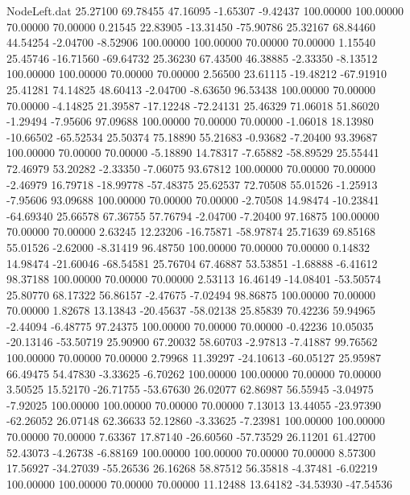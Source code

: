 \begin{filecontents}{NodeLeft.dat}
  25.27100   69.78455   47.16095    -1.65307   -9.42437  100.00000  100.00000   70.00000   70.00000    0.21545   22.83905  -13.31450  -75.90786
  25.32167   68.84460   44.54254    -2.04700   -8.52906  100.00000  100.00000   70.00000   70.00000    1.15540   25.45746  -16.71560  -69.64732
  25.36230   67.43500   46.38885    -2.33350   -8.13512  100.00000  100.00000   70.00000   70.00000    2.56500   23.61115  -19.48212  -67.91910
  25.41281   74.14825   48.60413    -2.04700   -8.63650   96.53438  100.00000   70.00000   70.00000   -4.14825   21.39587  -17.12248  -72.24131
  25.46329   71.06018   51.86020    -1.29494   -7.95606   97.09688  100.00000   70.00000   70.00000   -1.06018   18.13980  -10.66502  -65.52534
  25.50374   75.18890   55.21683    -0.93682   -7.20400   93.39687  100.00000   70.00000   70.00000   -5.18890   14.78317   -7.65882  -58.89529
  25.55441   72.46979   53.20282    -2.33350   -7.06075   93.67812  100.00000   70.00000   70.00000   -2.46979   16.79718  -18.99778  -57.48375
  25.62537   72.70508   55.01526    -1.25913   -7.95606   93.09688  100.00000   70.00000   70.00000   -2.70508   14.98474  -10.23841  -64.69340
  25.66578   67.36755   57.76794    -2.04700   -7.20400   97.16875  100.00000   70.00000   70.00000    2.63245   12.23206  -16.75871  -58.97874
  25.71639   69.85168   55.01526    -2.62000   -8.31419   96.48750  100.00000   70.00000   70.00000    0.14832   14.98474  -21.60046  -68.54581
  25.76704   67.46887   53.53851    -1.68888   -6.41612   98.37188  100.00000   70.00000   70.00000    2.53113   16.46149  -14.08401  -53.50574
  25.80770   68.17322   56.86157    -2.47675   -7.02494   98.86875  100.00000   70.00000   70.00000    1.82678   13.13843  -20.45637  -58.02138
  25.85839   70.42236   59.94965    -2.44094   -6.48775   97.24375  100.00000   70.00000   70.00000   -0.42236   10.05035  -20.13146  -53.50719
  25.90900   67.20032   58.60703    -2.97813   -7.41887   99.76562  100.00000   70.00000   70.00000    2.79968   11.39297  -24.10613  -60.05127
  25.95987   66.49475   54.47830    -3.33625   -6.70262  100.00000  100.00000   70.00000   70.00000    3.50525   15.52170  -26.71755  -53.67630
  26.02077   62.86987   56.55945    -3.04975   -7.92025  100.00000  100.00000   70.00000   70.00000    7.13013   13.44055  -23.97390  -62.26052
  26.07148   62.36633   52.12860    -3.33625   -7.23981  100.00000  100.00000   70.00000   70.00000    7.63367   17.87140  -26.60560  -57.73529
  26.11201   61.42700   52.43073    -4.26738   -6.88169  100.00000  100.00000   70.00000   70.00000    8.57300   17.56927  -34.27039  -55.26536
  26.16268   58.87512   56.35818    -4.37481   -6.02219  100.00000  100.00000   70.00000   70.00000   11.12488   13.64182  -34.53930  -47.54536

\end{filecontents}
